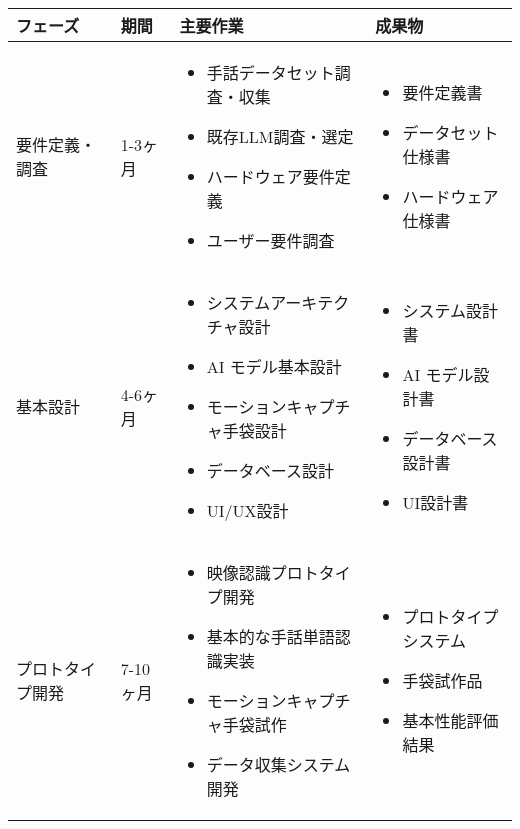 \documentclass[12pt,a4paper]{jsarticle}
\begin{document}
\begin{longtable}{|p{3cm}|p{2.5cm}|p{6cm}|p{3cm}|}
\hline
\textbf{フェーズ} & \textbf{期間} & \textbf{主要作業} & \textbf{成果物} \\
\hline
\endhead

要件定義・調査 & 1-3ヶ月 & 
\begin{itemize}
\item 手話データセット調査・収集
\item 既存LLM調査・選定
\item ハードウェア要件定義
\item ユーザー要件調査
\end{itemize} & 
\begin{itemize}
\item 要件定義書
\item データセット仕様書
\item ハードウェア仕様書
\end{itemize} \\
\hline

基本設計 & 4-6ヶ月 & 
\begin{itemize}
\item システムアーキテクチャ設計
\item AI モデル基本設計
\item モーションキャプチャ手袋設計
\item データベース設計
\item UI/UX設計
\end{itemize} & 
\begin{itemize}
\item システム設計書
\item AI モデル設計書
\item データベース設計書
\item UI設計書
\end{itemize} \\
\hline

プロトタイプ開発 & 7-10ヶ月 & 
\begin{itemize}
\item 映像認識プロトタイプ開発
\item 基本的な手話単語認識実装
\item モーションキャプチャ手袋試作
\item データ収集システム開発
\end{itemize} & 
\begin{itemize}
\item プロトタイプシステム
\item 手袋試作品
\item 基本性能評価結果
\end{itemize} \\
\hline


\end{longtable}
\end{document}
